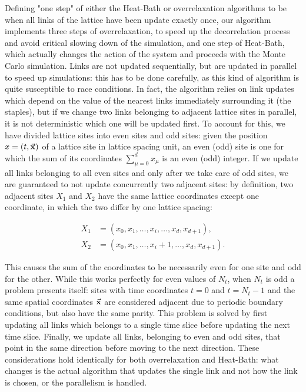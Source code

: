 \documentclass[reqno,12pt]{article}
\numberwithin{equation}{section}
\begin{document}
Defining "one step" of either the Heat-Bath or overrelaxation algorithms to be when all links of the lattice
have been update exactly once, our algorithm implements three steps of overrelaxation, to speed up the
decorrelation process and avoid critical slowing down of the simulation, and one step of Heat-Bath, which 
actually changes the action of the system and proceeds with the Monte Carlo simulation. Links are not updated
sequentially, but are updated in parallel to speed up simulations: this has to be done carefully, as this kind
of algorithm is quite susceptible to race conditions. In fact, the algorithm relies on link updates which
depend on the value of the nearest links immediately surrounding it (the staples), but if we change two links
belonging to adjacent lattice sites in parallel, it is not deterministic which one will be updated first. To 
account for this, we have divided lattice sites into even sites and odd sites: given the position 
$x = (t, \va{x})$ of a lattice site in lattice spacing unit, an even (odd) site is one for which the sum of its coordinates
$\sum_{\mu = 0}^d x_\mu$ is an even (odd) integer. If we update all links belonging to all even sites and only
after we take care of odd sites, we are guaranteed to not update concurrently two adjacent sites: by definition,
two adjacent sites $X_1$ and $X_2$ have the same lattice coordinates except one coordinate, in which
the two differ by one lattice spacing:

\begin{equation}
	\begin{aligned}
	X_1 &= (x_0, x_1, \dots, x_i, \dots, x_d, x_{d+1}), \\
	X_2 &= (x_0, x_1, \dots, x_i + 1, \dots, x_d, x_{d+1}).
	\end{aligned}
\end{equation}

This causes the sum of the coordinates to be necessarily even for one site and odd for the other. While this works
perfectly for even values of $N_t$, when $N_t$ is odd a problem presents itself: sites with time coordinates
$t = 0$ and $t = N_t - 1$ and the same spatial coordinates $\va{x}$ are considered 
adjacent due to periodic boundary conditions, but also have the same parity. This problem is solved by first
updating all links which belongs to a single time slice before updating the next time slice. Finally,
we update all links, belonging to even and odd sites, that point in the same direction before moving to the 
next direction. These considerations hold identically for both overrelaxation and Heat-Bath: what changes is the
actual algorithm that updates the single link and not how the link is chosen, or the parallelism is handled.
\end{document}
